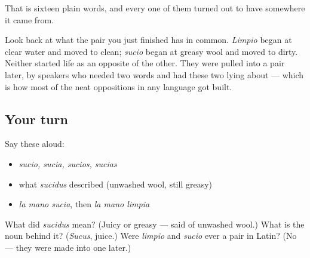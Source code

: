 \begin{grammarlens}[title={What you've built}]
That is sixteen plain words, and every one of them turned out to have somewhere it came from.

Look back at what the pair you just finished has in common. \emph{Limpio} began at clear water and moved to clean; \emph{sucio} began at greasy wool and moved to dirty. Neither started life as an opposite of the other. They were pulled into a pair later, by speakers who needed two words and had these two lying about — which is how most of the neat oppositions in any language got built.
\end{grammarlens}

\subsection*{Your turn}
Say these aloud:

\begin{itemize}
\raggedright
  \item \emph{sucio, sucia, sucios, sucias}
  \item what \emph{sucidus} described (unwashed wool, still greasy)
  \item \emph{la mano sucia}, then \emph{la mano limpia}
\end{itemize}

\begin{tcolorbox}[breakable,colback=teal!4,colframe=teal!35!black,title={Before you move on}]
What did \emph{sucidus} mean? (Juicy or greasy — said of unwashed wool.) What is the noun behind it? (\emph{Sucus}, juice.) Were \emph{limpio} and \emph{sucio} ever a pair in Latin? (No — they were made into one later.)
\end{tcolorbox}
